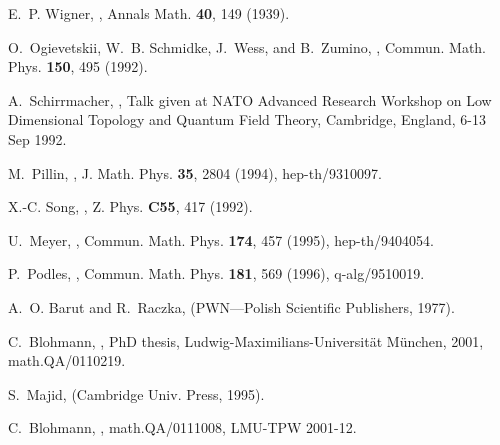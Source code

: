 \documentclass[12pt,a4paper]{article}
\begin{document}
\begin{thebibliography}{10}

E.~P. Wigner,
,
\newblock Annals Math. {\bf 40}, 149 (1939).

O.~Ogievetskii, W.~B. Schmidke, J.~Wess, and B.~Zumino,
,
\newblock Commun. Math. Phys. {\bf 150}, 495 (1992).

A.~Schirrmacher,
,
\newblock Talk given at NATO Advanced Research Workshop on Low Dimensional
  Topology and Quantum Field Theory, Cambridge, England, 6-13 Sep 1992.

M.~Pillin,
,
\newblock J. Math. Phys. {\bf 35}, 2804 (1994), hep-th/9310097.

X.-C. Song,
,
\newblock Z. Phys. {\bf C55}, 417 (1992).

U.~Meyer,
,
\newblock Commun. Math. Phys. {\bf 174}, 457 (1995), hep-th/9404054.

P.~Podles,
,
\newblock Commun. Math. Phys. {\bf 181}, 569 (1996), q-alg/9510019.

A.~O. Barut and R.~Raczka,
 (PWN---Polish
  Scientific Publishers, 1977).

C.~Blohmann,
,
\newblock PhD thesis, Ludwig-Maximilians-Universit{\"a}t M{\"unchen}, 2001,
  math.QA/0110219.

S.~Majid,
 (Cambridge Univ. Press,
  1995).

C.~Blohmann,
,
\newblock math.QA/0111008, LMU-TPW 2001-12.


\end{thebibliography}
\end{document}
